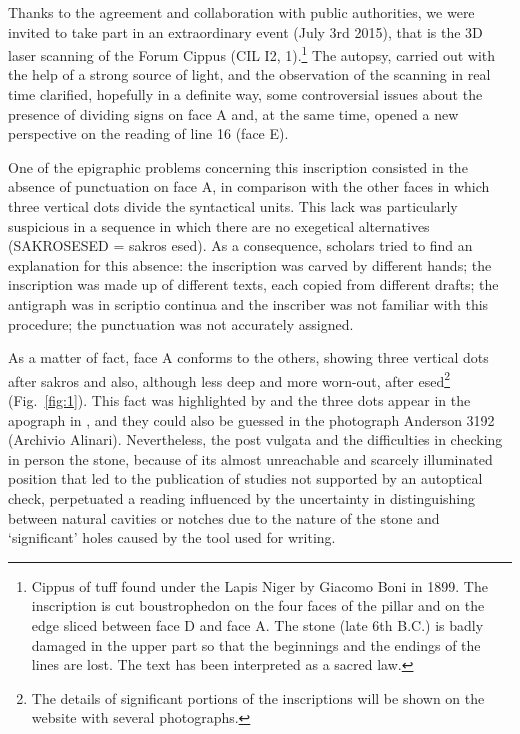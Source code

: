 \documentclass[amsthm,ebook]{saparticle}
\begin{document}
\noindent Thanks to the agreement and collaboration with public authorities, we were invited to take part in an extraordinary
event (July 3rd 2015), that is the 3D laser scanning of the Forum Cippus (CIL I2, 1).\footnote{Cippus of tuff found
under the Lapis Niger by Giacomo Boni in 1899. The inscription is cut boustrophedon on the four faces of the pillar and
on the edge sliced between face D and face A. The stone (late 6th B.C.) is badly damaged in the upper part so that the
beginnings and the endings of the lines are lost. The text has been interpreted as a sacred law.} The autopsy, carried
out with the help of a strong source of light, and the observation of the scanning in real time clarified, hopefully in
a definite way, some controversial issues about the presence of dividing signs on face A and, at the same time, opened
a new perspective on the reading of line 16 (face E). 

One of the epigraphic problems concerning this inscription consisted in the absence of punctuation on face A, in
comparison with the other faces in which three vertical dots divide the syntactical units. This lack was particularly
suspicious in a sequence in which there are no exegetical alternatives (SAKROSESED = sakros esed). As a consequence,
scholars tried to find an explanation for this absence: the inscription was carved by different hands; the inscription
was made up of different texts, each copied from different drafts; the antigraph was in scriptio continua and the
inscriber was not familiar with this procedure; the punctuation was not accurately assigned.

As a matter of fact, face A conforms to the others, showing three vertical dots after sakros and also, although less
deep and more worn-out, after esed\footnote{The details of significant portions of the inscriptions will be shown on
the website with several photographs. } (Fig.~\ref{fig:1}). This fact was highlighted by \citet{gamurrini_paleografia_1899} and the three dots
appear in the apograph in \citet[col. 1003]{hulsen_neue_1899},  and they could also be guessed in the photograph Anderson 3192
(Archivio Alinari). Nevertheless, the post \citet{goidanich_rapporti_1943} vulgata and the difficulties in checking in person the
stone, because of its almost unreachable and scarcely illuminated position that led to the publication of studies not
supported by an autoptical check, perpetuated a reading influenced by the uncertainty in distinguishing between natural
cavities or notches due to the nature of the stone and `significant' holes caused by the tool used for writing. 
\end{document}
